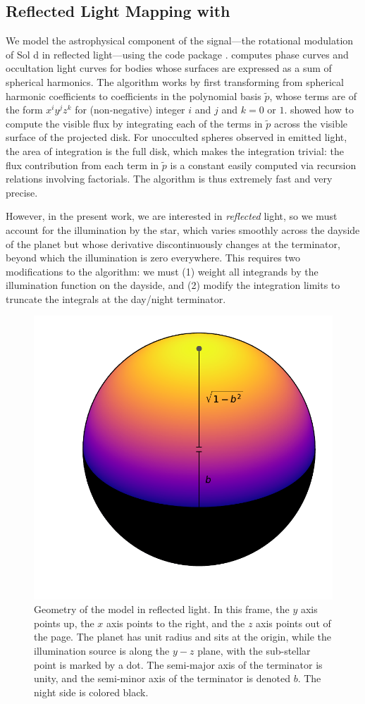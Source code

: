 \documentclass[modern]{aastex62}
\begin{document}
\subsection{Reflected Light Mapping with \starry}
\label{sec:starry}

We model the astrophysical component of the signal---the rotational modulation
of Sol d in reflected light---using the \starry code package \citep{Luger2019}.
\starry computes phase curves and occultation light curves for bodies whose
surfaces are expressed as a sum of spherical harmonics. 
The algorithm works by first transforming
from spherical harmonic coefficients to coefficients in the polynomial basis $\tilde{p}$, whose
terms are of the form $x^i y^j z^k$ for (non-negative) integer $i$ and $j$ 
and $k = 0$ or $1$. \citet{Luger2019} showed how to compute the visible
flux by integrating each of the terms in $\tilde{p}$ across the visible
surface of the projected disk. For unocculted spheres observed in emitted
light, the area of integration is the full disk, which makes the integration
trivial: the flux contribution from each term in $\tilde{p}$ is a constant
easily computed via recursion relations involving factorials. The algorithm is
thus extremely fast and very precise.

However, in the present work, we are interested in \emph{reflected} light, so we must
account for the illumination by the star, which varies smoothly
across the dayside of the planet but whose derivative discontinuously changes at the 
terminator, beyond which the illumination is zero everywhere. This requires
two modifications to the \starry algorithm: we must (1) weight all integrands
by the illumination function on the dayside, and (2) modify the integration
limits to truncate the integrals at the day/night terminator.

\begin{figure}[t!]
    \begin{centering}
    \includegraphics[width=0.4\linewidth]{figures/geometry.pdf}
    \caption{\label{fig:geometry}
             Geometry of the \starry model in reflected light. In this frame, 
             the $y$ axis points up, 
             the $x$ axis points to the right, and the $z$ axis points out of the page.
             The planet has unit radius and sits at the origin, while
             the illumination source is along the $y-z$ plane, with the sub-stellar point is
             marked by a dot. The semi-major axis of the terminator is unity, and
             the semi-minor axis of the terminator is denoted $b$. The night side
             is colored black.
             }
    \end{centering}
\end{figure}
\end{document}
